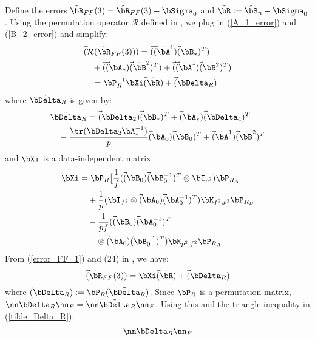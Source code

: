 \begin{IEEEproof}
Define the errors $\tilde{\bR}_{FF}(3)=\hat{\bR}_{FF}(3) - \bSigma_0$ and $\tilde{\bR}:=\hat{\bS}_n-\bSigma_0$. Using the permutation operator $\mathcal{R}$ defined in \cite{EstCovMatKron}, we plug in (\ref{A_1_error}) and (\ref{B_2_error}) and simplify: 
\begin{align}
	& \vec(\mathcal{R}(\tilde{\bR}_{FF}(3))) = \vec(\vec(\tilde{\bA}^1)\vec(\bB_*)^T) \nonumber \\
		&\quad + \vec(\vec(\bA_*)\vec(\tilde{\bB}^2)^T) + \vec(\vec(\tilde{\bA}^1)\vec(\tilde{\bB^2})^T) \nonumber\\
		&\quad = \bP_R^{-1}\bXi \vec(\tilde{\bR}) + \vec(\tilde{\bDelta}_R) \label{error_FF_1}
\end{align}
where $\tilde{\bDelta}_R$ is given by:
\begin{align}
	& \tilde{\bDelta}_R = \vec(\bDelta_2)\vec(\bB_*)^T + \vec(\bA_*)\vec(\bDelta_4)^T \nonumber \\
	&\quad -\frac{\tr(\bDelta_2 \bA_*^{-1})}{p} \vec(\bA_0)\vec(\bB_0)^T + \vec(\tilde{\bA}^1)\vec(\tilde{\bB}^2)^T \label{tilde_Delta_R}
\end{align}
and $\bXi$ is a data-independent matrix:
\begin{align}
	\bXi &= \bP_R \big[ \frac{1}{f} (\vec(\bB_0)\vec(\bB_0^{-1})^T\otimes \bI_{p^2}) \bP_{R_A} \nonumber \\
		&\quad + \frac{1}{p} (\bI_{f^2}\otimes \vec(\bA_0)\vec(\bA_0^{-1})^T) \bK_{f^2,p^2} \bP_{R_B} \nonumber \\
		&\quad - \frac{1}{pf} (\vec(\bB_0)\vec(\bA_0^{-1})^T \nonumber \\
		&\qquad \otimes \vec(\bA_0)\vec(\bB_0^{-1})^T) \bK_{p^2,f^2} \bP_{R_A} \big] \label{bXi_def}
\end{align}
From (\ref{error_FF_1}) and (24) in \cite{EstCovMatKron}, we have:
\begin{equation} \label{error_FF_2}
	\vec(\tilde{\bR}_{FF}(3)) = \bXi \vec(\tilde{\bR}) + \vec(\bDelta_R)
\end{equation}
where $\vec(\bDelta_R):=\bP_R \vec(\tilde{\bDelta}_R)$. Since $\bP_R$ is a permutation matrix, $\nn \bDelta_R \nn_F = \nn \tilde{\bDelta}_R \nn_F$. Using this and the triangle inequality in (\ref{tilde_Delta_R}):
\begin{align}
	\nn \bDelta_R \nn_F %

\end{align}
\end{IEEEproof}
